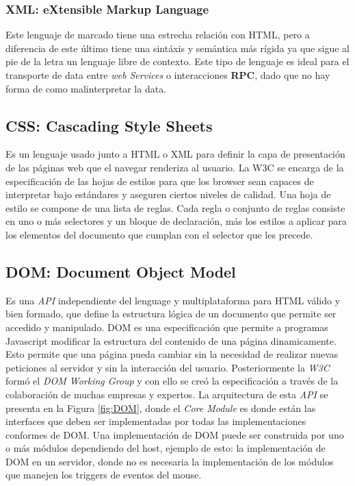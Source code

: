         \subsubsection{XML: eXtensible Markup Language}
        \label{chap2:XML}
        Este lenguaje de marcado tiene una estrecha relación con HTML, pero a diferencia de este último tiene una sintáxis y semántica más rígida ya que sigue al pie de la letra un lenguaje libre de contexto. Este tipo de lenguaje es ideal para el transporte de data entre \textit{web Services} o interacciones \textbf{RPC}, dado que no hay forma de como malinterpretar la data.


    \subsection{CSS: Cascading Style Sheets}
    \label{chap2:css}
    Es un lenguaje usado junto a HTML o XML para definir la capa de presentación de las páginas web que el navegar renderiza al usuario. La W3C se encarga de la especificación de las hojas de estilos para que los browser sean capaces de interpretar bajo estándares y aseguren ciertos niveles de calidad. Una hoja de estilo se compone de una lista de reglas. Cada regla o conjunto de reglas consiste en uno o más selectores y un bloque de declaración, más los estilos a aplicar para los elementos del documento que cumplan con el selector que les precede. 


    \subsection{DOM: Document Object Model}
    \label{chap2:DOM}
    Es una \textit{API} independiente del lenguage y multiplataforma para HTML válido y bien formado, que define la estructura lógica de un documento que permite ser accedido y manipulado. DOM es una especificación que permite a programas Javascript modificar la estructura del contenido de una página dinamicamente. Esto permite que una página pueda cambiar sin la necesidad de realizar nuevas peticiones al servidor y sin la interacción del usuario. Posteriormente la \textit{W3C} \cite{w3c} formó el \textit{DOM Working Group} y con ello se creó la especificación a través de la colaboración de muchas empresas y expertos. La arquitectura de esta \textit{API} se presenta en la Figura \ref{fig:DOM}, donde el \textit{Core Module} es donde están las interfaces que deben ser implementadas por todas las implementaciones conformes de DOM. Una implementación de DOM puede ser construida por uno o más módulos dependiendo del host, ejemplo de esto: la implementación de DOM en un servidor, donde no es necesaria la implementación de los módulos que manejen los triggers de eventos del mouse.
            
